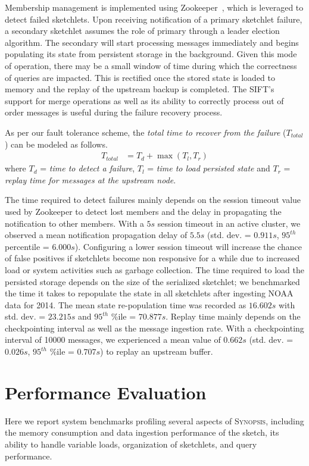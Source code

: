 \documentclass[9pt,journal,compsoc]{IEEEtran}
\begin{document}
Membership management is implemented using Zookeeper~\cite{hunt2010zookeeper}, which is leveraged to detect failed sketchlets.
Upon receiving notification of a primary sketchlet failure, a secondary sketchlet assumes the role of primary through a leader election algorithm.
The secondary will start processing messages immediately and begins populating its state from persistent storage in the background.
Given this mode of operation, there may be a small window of time during which the correctness of queries are impacted.
This is rectified once the stored state is loaded to memory and the replay of the upstream backup is completed.
The SIFT's support for merge operations as well as its ability to correctly process out of order messages is useful during the failure recovery process.

As per our fault tolerance scheme, the \textit{total time to recover from the failure} ($T_{total}$) can be modeled as follows.
\begin{align*}
    T_{total} &= T_{d} + \max{(T_{l}, T_{r})}      
\end{align*}
where $T_{d}$ = \textit{time to detect a failure}, $T_{l}$ = \textit{time to load persisted state} and $T_{r}$ = \textit{replay time for messages at the upstream node}.

The time required to detect failures mainly depends on the session timeout value used by Zookeeper to detect lost members and the delay in propagating the notification to other members. With a $5s$ session timeout in an active cluster, we observed a mean notification propagation delay of $5.5s$ (std. dev. = $0.911s$, $95^{th}$ percentile = $6.000s$). Configuring a lower session timeout will increase the chance of false positives if sketchlets become non responsive for a while due to increased load or system activities such as garbage collection. The time required to load the persisted storage depends on the size of the serialized sketchlet; we benchmarked the time it takes to repopulate the state in all sketchlets after ingesting NOAA data for 2014. The mean state re-population time was recorded as $16.602s$ with std. dev. = $23.215s$ and $95^{th}$ \%ile = $70.877s$. Replay time mainly depends on the checkpointing interval as well as the message ingestion rate. With a checkpointing interval of 10000 messages, we experienced a mean value of $0.662s$ (std. dev. = $0.026s$, $95^{th}$ \%ile = $0.707s$) to replay an upstream buffer.
%
%
\section{Performance Evaluation}
Here we report system benchmarks profiling several aspects of \textsc{Synopsis}, including the memory consumption and data ingestion performance of the sketch, its ability to handle variable loads, organization of sketchlets, and query performance.
\label{sec:performance}
\end{document}
